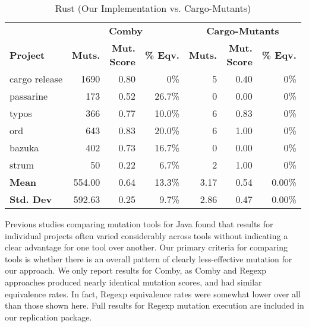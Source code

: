 \documentclass[acmsmall,screen,review,anonymous]{acmart}
\begin{document}
{%

\begin{table}[htbp]
\centering
\caption{Rust (Our Implementation vs. Cargo-Mutants)}
\label{tab:table_rust2}
\begin{varwidth}{.8\linewidth}
\begin{tabularx}{\columnwidth}{X|rrr|rrr}
\toprule
        & \multicolumn{3}{c|}{\textbf{Comby}}  & \multicolumn{3}{c}{\textbf{Cargo-Mutants}} \\ 
\textbf{Project} & \textbf{Muts.} & \makecell{\textbf{Mut.} \\ \textbf{Score}} & \textbf{\% Eqv.} & \textbf{Muts.} & \makecell{\textbf{Mut.} \\ \textbf{Score}} & \textbf{\% Eqv.} \\\midrule
cargo release & 1690 & 0.80 & 0\% & 5 & 0.40 & 0\%   \\
passarine & 173 & 0.52 & 26.7\% & 0 & 0.00 & 0\%   \\
typos & 366 & 0.77 & 10.0\% & 6 & 0.83 & 0\%   \\
ord & 643 & 0.83 & 20.0\% & 6 & 1.00 & 0\%   \\
bazuka & 402 & 0.73 & 16.7\% & 0 & 0.00 & 0\%   \\
strum & 50 & 0.22 & 6.7\% & 2 & 1.00 & 0\%   \\\midrule
\textbf{Mean}   & 554.00 & 0.64 & 13.3\% & 3.17 & 0.54 & 0.00\%\\
\textbf{Std. Dev} & 592.63 & 0.25 & 9.7\%   & 2.86 & 0.47 & 0.00\% \\\bottomrule
\end{tabularx}
\end{varwidth}
\end{table}

Previous studies comparing mutation tools for Java
\cite{MajorPIT,gopinath2017does,CommACMJavaTool} found that results
for individual projects often varied considerably across tools without
indicating a clear advantage for one tool over another.  Our primary
criteria for comparing tools is whether there is an overall pattern of
clearly less-effective mutation for our approach.  We only report
results for Comby, as Comby and Regexp approaches produced nearly
identical mutation scores, and had similar equivalence rates.  In
fact, Regexp equivalence rates were somewhat lower over all than those
shown here.  Full results for Regexp mutation execution are included
in our replication package.

}
\end{document}
